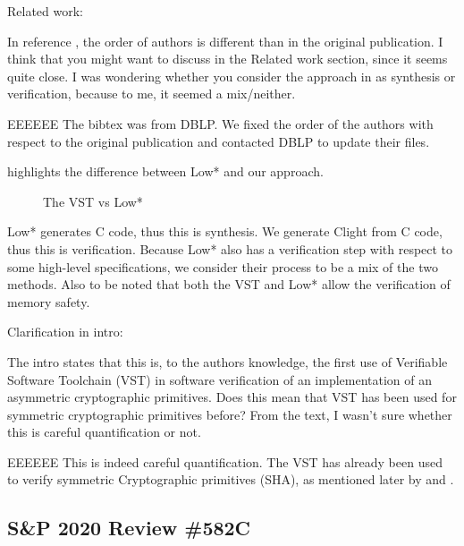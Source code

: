 Related work:

\newcommand{\rbar}{\cite{DBLP:journals/corr/BhargavanDFHPRR17}}

In reference \rbar, the order of authors is different than
in the original publication. I think that you might want to
discuss \rbar in the Related work section, since it seems quite
close. I was wondering whether you consider the approach
in \rbar as synthesis or verification, because to me, it seemed
a mix/neither.

\begin{answer}{EEEEEE}
The bibtex was from DBLP. We fixed the order of the
authors with respect to the original publication and contacted
DBLP to update their files.

 highlights the difference between Low*
and our approach.

\begin{figure}[H]
\centering

\caption{The VST vs Low*}
\label{tikz:LowVST}
\end{figure}

Low* generates C code, thus this is synthesis. We generate
Clight from C code, thus this is verification. Because Low*
also has a verification step with respect to some high-level
specifications, we consider their process to be a mix of the
two methods. Also to be noted that both the VST and Low*
allow the verification of memory safety.
\end{answer}

Clarification in intro:

The intro states that this is, to the authors knowledge, the
first use of Verifiable Software Toolchain (VST) in software
verification of an implementation of an asymmetric cryptographic
primitives. Does this mean that VST has been used
for symmetric cryptographic primitives before? From the text,
I wasn’t sure whether this is careful quantification or not.

\begin{answer}{EEEEEE}
This is indeed careful quantification. The VST has already
been used to verify symmetric Cryptographic primitives
(\eg SHA), as mentioned later by \cite{Beringer2015VerifiedCA} and \cite{2015-Appel}.
\end{answer}


\subsection{S\&P 2020 Review \#582C}

